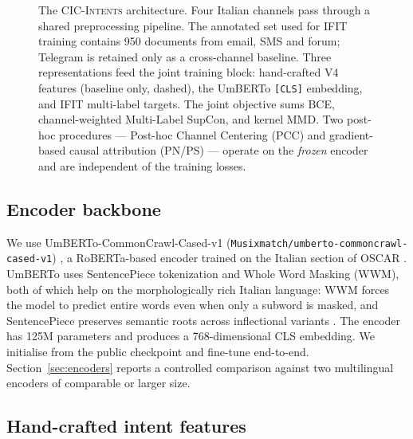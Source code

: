 \documentclass[preprint,12pt,authoryear]{elsarticle}
\begin{document}
\begin{figure}[htbp]

\caption{The \textsc{CIC-Intents} architecture. Four Italian channels
pass through a shared preprocessing pipeline. The annotated set used
for IFIT training contains 950 documents from email, SMS and forum;
Telegram is retained only as a cross-channel baseline. Three
representations feed the joint training block: hand-crafted V4
features (baseline only, dashed), the UmBERTo \texttt{[CLS]} embedding,
and IFIT multi-label targets. The joint objective sums BCE,
channel-weighted Multi-Label SupCon, and kernel MMD. Two post-hoc
procedures --- Post-hoc Channel Centering (PCC) and gradient-based
causal attribution (PN/PS) --- operate on the \emph{frozen} encoder and
are independent of the training losses.}
\label{fig:arch}
\end{figure}

\subsection{Encoder backbone}

We use UmBERTo-CommonCrawl-Cased-v1
(\texttt{Musixmatch/umberto-commoncrawl-cased-v1})
\citep{umberto2020}, a RoBERTa-based encoder \citep{liu2019roberta}
trained on the Italian section of OSCAR \citep{suarez2019oscar}.
UmBERTo uses SentencePiece tokenization and Whole Word Masking
(WWM), both of which help on the morphologically rich Italian
language: WWM forces the model to predict entire words even when
only a subword is masked, and SentencePiece preserves semantic roots
across inflectional variants \citep{umberto2020}. The encoder has
125M parameters and produces a 768-dimensional CLS embedding. We
initialise from the public checkpoint and fine-tune end-to-end.
Section~\ref{sec:encoders} reports a controlled comparison against
two multilingual encoders of comparable or larger size.

\subsection{Hand-crafted intent features}
\label{sec:v4}
\end{document}
